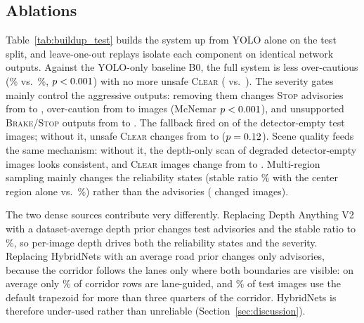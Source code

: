 \documentclass[conference,a4paper]{IEEEtran}
\newif\ifextended
\newcommand{\st}[1]{\textsc{#1}}
\begin{document}
\subsection{Ablations}
\label{sec:ablations}
Table~\ref{tab:buildup_test} builds the system up from YOLO alone on the test split, and leave-one-out replays isolate each component on identical network outputs. Against the YOLO-only baseline B0, the full system is less over-cautious (\TestOverPct\% vs.\ \TestBZeroOverPct\%, $p<0.001$) with no more unsafe \st{Clear} (\TestUnsafe{} vs.\ \TestBZeroUnsafe). The severity gates mainly control the aggressive outputs: removing them changes \st{Stop} advisories from \TestStop{} to \TestNoGatesStop{}, over-caution from \TestOver{} to \TestNoGatesOver{} images (McNemar $p<0.001$), and unsupported \st{Brake}/\st{Stop} outputs from \TestUnsupported{} to \TestNoGatesUnsupported. The fallback fired on \TestFallback{} of the \TestEmpty{} detector-empty test images; without it, unsafe \st{Clear} changes from \TestUnsafe{} to \TestUnsafeNoFB{} ($p=0.12$). Scene quality feeds the same mechanism: without it, the depth-only scan of degraded detector-empty images looks consistent, and \st{Clear} images change from \TestClear{} to \TestNoSQClear. Multi-region sampling mainly changes the reliability states (stable ratio \TestSingleStablePct\% with the center region alone vs.\ \TestStablePct\%) rather than the advisories (\TestSingleChanged{} changed images).

The two dense sources contribute very differently. Replacing Depth Anything V2 with a dataset-average depth prior changes \TestNoDepthChanged{} test advisories and the stable ratio to \TestNoDepthStablePct\%, so per-image depth drives both the reliability states and the severity. Replacing HybridNets with an average road prior changes only \TestNoHybChanged{} advisories, because the corridor follows the lanes only where both boundaries are visible: on average only \TestLaneGuidedPct\% of corridor rows are lane-guided, and \TestMostlyTrapezoidPct\% of test images use the default trapezoid for more than three quarters of the corridor. HybridNets is therefore under-used rather than unreliable (Section~\ref{sec:discussion}).

\ifextended\else\fi
\end{document}
